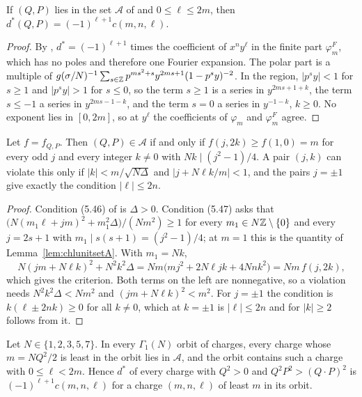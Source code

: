\begin{lemma}\label{lem:chlboundedcoef}
If $(Q,P)$ lies in the set $\mathcal A$ of \cite[(5.46)--(5.47)]{BSS25} and $0\le\ell\le 2m$, then $d^*(Q,P)=(-1)^{\ell+1}c(m,n,\ell)$.
\end{lemma}

\begin{proof}
By \cite[Theorem~5.4(a)]{BSS25}, $d^*=(-1)^{\ell+1}$ times the coefficient of $x^ny^\ell$ in the finite part $\varphi^F_m$, which has no poles and therefore one Fourier expansion. The polar part is \cite[(5.45)]{BSS25} a multiple of $g(\sigma/N)^{-1}\sum_{s\in\mathbb{Z}}p^{ms^2+s}y^{2ms+1}(1-p^sy)^{-2}$. In the region, $|p^sy|<1$ for $s\ge1$ and $|p^sy|>1$ for $s\le0$, so the term $s\ge1$ is a series in $y^{2ms+1+k}$, the term $s\le-1$ a series in $y^{2ms-1-k}$, and the term $s=0$ a series in $y^{-1-k}$, $k\ge0$. No exponent lies in $[0,2m]$, so at $y^\ell$ the coefficients of $\varphi_m$ and $\varphi^F_m$ agree.
\end{proof}

\begin{lemma}\label{lem:chlsetA}
Let $f=f_{Q,P}$. Then $(Q,P)\in\mathcal A$ if and only if $f(j,2k)\ge f(1,0)=m$ for every odd $j$ and every integer $k\ne0$ with $Nk\mid(j^2-1)/4$. A pair $(j,k)$ can violate this only if $|k|<m/\sqrt{N\Delta}$ and $|j+N\ell k/m|<1$, and the pairs $j=\pm1$ give exactly the condition $|\ell|\le2n$.
\end{lemma}

\begin{proof}
Condition (5.46) of \cite{BSS25} is $\Delta>0$. Condition (5.47) asks that $\big(N(m_1\ell+jm)^2+m_1^2\Delta\big)/(Nm^2)\ge1$ for every $m_1\in N\mathbb{Z}\setminus\{0\}$ and every $j=2s+1$ with $m_1\mid s(s+1)=(j^2-1)/4$; at $m=1$ this is the quantity of Lemma~\ref{lem:chlunitsetA}. With $m_1=Nk$,
\[
N(jm+N\ell k)^2+N^2k^2\Delta=Nm\big(mj^2+2N\ell jk+4Nnk^2\big)=Nm\,f(j,2k),
\]
which gives the criterion. Both terms on the left are nonnegative, so a violation needs $N^2k^2\Delta<Nm^2$ and $(jm+N\ell k)^2<m^2$. For $j=\pm1$ the condition is $k(\ell\pm2nk)\ge0$ for all $k\ne0$, which at $k=\pm1$ is $|\ell|\le 2n$ and for $|k|\ge2$ follows from it.
\end{proof}

\begin{theorem}\label{thm:chlleast}
Let $N\in\{1,2,3,5,7\}$. In every $\Gamma_1(N)$ orbit of charges, every charge whose $m=NQ^2/2$ is least in the orbit lies in $\mathcal A$, and the orbit contains such a charge with $0\le\ell<2m$. Hence $d^*$ of every charge with $Q^2>0$ and $Q^2P^2>(Q\cdot P)^2$ is $(-1)^{\ell+1}c(m,n,\ell)$ for a charge $(m,n,\ell)$ of least $m$ in its orbit.
\end{theorem}

